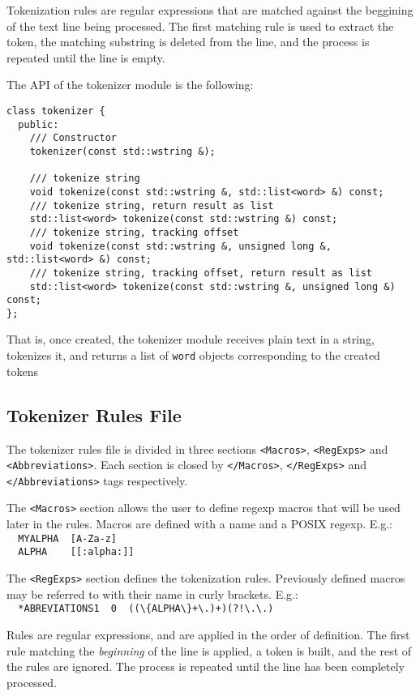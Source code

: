\documentclass[a4paper]{book}
\begin{document}
  Tokenization rules are regular expressions that are matched against
  the beggining of the text line being processed. The first matching
  rule is used to extract the token, the matching substring is deleted
  from the line, and the process is repeated until the line is empty.

  The API of the tokenizer module is the following:
\begin{verbatim}
class tokenizer {
  public:
    /// Constructor
    tokenizer(const std::wstring &);

    /// tokenize string 
    void tokenize(const std::wstring &, std::list<word> &) const;
    /// tokenize string, return result as list
    std::list<word> tokenize(const std::wstring &) const;
    /// tokenize string, tracking offset
    void tokenize(const std::wstring &, unsigned long &, std::list<word> &) const;
    /// tokenize string, tracking offset, return result as list
    std::list<word> tokenize(const std::wstring &, unsigned long &) const;
};
\end{verbatim}

  That is, once created, the tokenizer module receives plain text in a
  string, tokenizes it, and returns a list of {\tt word} objects
  corresponding to the created tokens

\subsection{Tokenizer Rules File}

  The tokenizer rules file is divided in three sections
  \verb#<Macros>#, \verb#<RegExps># and \verb#<Abbreviations>#.  Each
  section is closed by \verb#</Macros>#, \verb#</RegExps># and
  \verb#</Abbreviations># tags respectively.
  
   The \verb#<Macros># section allows the user to define regexp macros
   that will be used later in the rules. Macros are defined with a name and
   a POSIX regexp. E.g.:\\
   \verb#  MYALPHA  [A-Za-z]#\\
   \verb#  ALPHA    [[:alpha:]]#

    The \verb#<RegExps># section defines the tokenization
   rules. Previously defined macros may be referred to with their name
   in curly brackets. E.g.:\\
   \verb#  *ABREVIATIONS1  0  ((\{ALPHA\}+\.)+)(?!\.\.)#

   Rules are regular expressions, and are applied in the order of definition. 
   The first rule matching the {\em beginning} of the line is applied,
   a token is built, and the rest of the rules are ignored.
   The process is repeated until the line has been completely processed.
\end{document}
